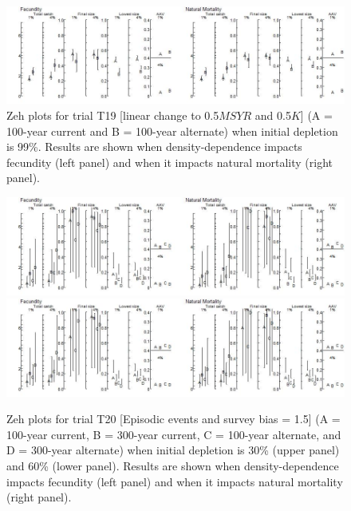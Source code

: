 \documentclass{article}\usepackage[]{graphicx}\usepackage[]{color}
\providecommand\phantomsection{}
\begin{document}
\begin{landscape}
\begin{figure}[H]
\centering
\includegraphics[]{SC66aRMP10_Part2_T19-D.jpeg}
\caption{
Zeh plots for trial T19
[linear change to 0.5$MSYR$ and 0.5$K$]
(A = 100-year current and B = 100-year alternate)
when initial depletion is 99\%.
Results are shown when density-dependence impacts fecundity (left panel) and when it impacts natural mortality (right panel).
}
\end{figure}

\clearpage
\phantomsection
{}
\setcounter{figure}{0}


\begin{figure}[H]
\centering
\includegraphics[]{SC66aRMP10_Part2_T20-R.jpeg}
\includegraphics[]{SC66aRMP10_Part2_T20-S.jpeg}
\caption{
Zeh plots for trial T20
[Episodic events and survey bias = 1.5]
(A = 100-year current, B = 300-year current, C = 100-year alternate, and D = 300-year alternate)
when initial depletion is 30\% (upper panel) and 60\% (lower panel).
Results are shown when density-dependence impacts fecundity (left panel) and when it impacts natural mortality (right panel).
}
\end{figure}


\end{landscape}
\end{document}

